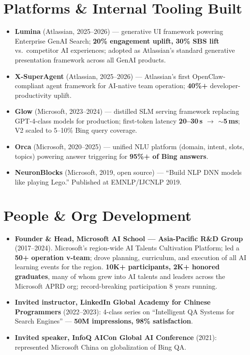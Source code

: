 \documentclass[10.5pt,letterpaper]{article}
\begin{document}
\section*{Platforms \& Internal Tooling Built}
\begin{itemize}
  \item \textbf{Lumina} (Atlassian, 2025--2026) --- generative UI framework powering Enterprise GenAI Search; \textbf{20\% engagement uplift, 30\% SBS lift} vs.\ competitor AI experiences; adopted as Atlassian's standard generative presentation framework across all GenAI products.
  \item \textbf{X-SuperAgent} (Atlassian, 2025--2026) --- Atlassian's first OpenClaw-compliant agent framework for AI-native team operation; \textbf{40\%+} developer-productivity uplift.
  \item \textbf{Glow} (Microsoft, 2023--2024) --- distilled SLM serving framework replacing GPT-4-class models for production; first-token latency \textbf{20--30\,s $\to$ $\sim$5\,ms}; V2 scaled to 5--10\% Bing query coverage.
  \item \textbf{Orca} (Microsoft, 2020--2025) --- unified NLU platform (domain, intent, slots, topics) powering answer triggering for \textbf{95\%+ of Bing answers}.
  \item \textbf{NeuronBlocks} (Microsoft, 2019, open source) --- ``Build NLP DNN models like playing Lego.'' Published at EMNLP/IJCNLP 2019.
\end{itemize}

\section*{People \& Org Development}
\begin{itemize}
  \item \textbf{Founder \& Head, Microsoft AI School --- Asia-Pacific R\&D Group} (2017--2024). Microsoft's region-wide AI Talents Cultivation Platform; led a \textbf{50+ operation v-team}; drove planning, curriculum, and execution of all AI learning events for the region. \textbf{10K+ participants, 2K+ honored graduates}, many of whom grew into AI talents and leaders across the Microsoft APRD org; record-breaking participation 8 years running.
  \item \textbf{Invited instructor, LinkedIn Global Academy for Chinese Programmers} (2022--2023): 4-class series on ``Intelligent QA Systems for Search Engines'' --- \textbf{50M impressions, 98\% satisfaction}.
  \item \textbf{Invited speaker, InfoQ AICon Global AI Conference} (2021): represented Microsoft China on globalization of Bing QA.
\end{itemize}
\end{document}
